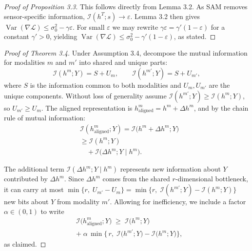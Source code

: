 \documentclass[letterpaper]{article} %
\theoremstyle{definition}                %
\theoremstyle{plain}                     %
\theoremstyle{remark}                    %
\DeclareMathOperator{\Var}{Var}
\begin{document}
\begin{proof}[Proof of Proposition 3.3]
This follows directly from Lemma 3.2.  As SAM removes sensor-specific information, $\mathcal{I}(h^T;s)\to\varepsilon$.  Lemma 3.2 then gives $\Var(\nabla\mathcal{L}) \le \sigma_0^2 - \gamma\varepsilon$.  For small $\varepsilon$ we may rewrite $\gamma\varepsilon = \gamma'(1-\varepsilon)$ for a constant $\gamma'>0$, yielding $\Var(\nabla\mathcal{L}) \le \sigma_0^2 - \gamma'(1-\varepsilon)$, as stated. 
\end{proof}

\begin{proof}[Proof of Theorem 3.4]
Under Assumption 3.4, decompose the mutual information for modalities $m$ and $m'$ into shared and unique parts:
\[
\mathcal{I}(h^m;Y) = S + U_m,\qquad
\mathcal{I}(h^{m'};Y) = S + U_{m'},
\]
where $S$ is the information common to both modalities and $U_m,U_{m'}$ are the unique components.  Without loss of generality assume $\mathcal{I}(h^{m'};Y)\ge \mathcal{I}(h^m;Y)$, so $U_{m'}\ge U_m$.  The aligned representation is $h^m_{\mathrm{aligned}} = h^m + \Delta h^m$, and by the chain rule of mutual information:
\[
\begin{alignedat}{1}
&\mathcal{I}(h^m_{\mathrm{aligned}};Y)
  = \mathcal{I}\!\bigl(h^m+\Delta h^m;Y\bigr) \\[2pt]
&\ge \mathcal{I}(h^m;Y) \\
&\quad + \mathcal{I}\!\bigl(\Delta h^m;Y \mid h^m\bigr).
\end{alignedat}
\]


The additional term $\mathcal{I}(\Delta h^m;Y\mid h^m)$ represents new information about $Y$ contributed by $\Delta h^m$.  Since $\Delta h^m$ comes from the shared $r$-dimensional bottleneck, it can carry at most $\min\{r,\;U_{m'}-U_m\} = \min\{r,\;\mathcal{I}(h^{m'};Y)-\mathcal{I}(h^m;Y)\}$ new bits about $Y$ from modality $m'$.  Allowing for inefficiency, we include a factor $\alpha\in(0,1)$ to write
\[
\begin{aligned}
&\mathcal{I}\!\bigl(h^m_{\mathrm{aligned}};Y\bigr)
\;\ge\;\mathcal{I}\!\bigl(h^m;Y\bigr)
\\
&+\;\alpha\,\min\!\bigl\{\,r,\;\mathcal{I}\!\bigl(h^{m'};Y\bigr)-\mathcal{I}\!\bigl(h^m;Y\bigr)\bigr\},
\end{aligned}
\]
as claimed.
\end{proof}
\end{document}
